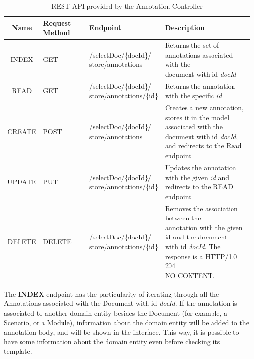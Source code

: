 \begin{table}[h]
\begin{tabular}{ | c | m{1.5cm} | m{3.5cm} |m{7.7cm}|}
    \hline
    \textbf{Name} & \textbf{Request} \textbf{Method }& \textbf{Endpoint} & \textbf{Description}\\ \hline
	INDEX & GET & \parbox[c][1.5cm]{3.5cm}{/selectDoc/\{docId\}/\\store/annotations} & \parbox[c]{8cm}{Returns the set of annotations associated with the \\document with id \textit{docId} }\\ \hline
   	READ & GET & \parbox[c][1.5cm]{3.5cm}{/selectDoc/\{docId\}/\\store/annotations/\{id\}} & Returns the annotation with the specific \textit{id} \\ \hline
    CREATE & POST & \parbox[c]{3.5cm}{/selectDoc/\{docId\}/\\store/annotations} & \parbox[c][1.5cm]{8cm}{Creates a new annotation, stores it in the model \\associated with the document with id \textit{docId}, \\ and redirects to the Read endpoint} \\ \hline
    UPDATE & PUT & \parbox[c][1.5cm]{3.5cm}{/selectDoc/\{docId\}/\\store/annotations/\{id\}} & \parbox[c]{8cm}{Updates the annotation with the given \textit{id} and \\redirects to the READ endpoint} \\ \hline
    DELETE & DELETE & \parbox[t]{3.5cm}{/selectDoc/\{docId\}/\\store/annotations/\{id\}} & \parbox[c][2cm]{8cm}{Removes the association between the \\ annotation with the given id and the document \\ with id \textit{docId}. The response is a HTTP/1.0 204 \\ NO CONTENT.} \\ \hline
  \end{tabular}
  \caption{REST API provided by the Annotation Controller}
  \label{table:endpoints}
\end{table}

The \textbf{INDEX} endpoint has the particularity of iterating through all the Annotations associated with the Document with id \textit{docId}. If the annotation is associated to another domain entity besides the Document (for example, a Scenario, or a Module), information about the domain entity will be added to the annotation body, and will be shown in the interface. This way, it is possible to have some information about the domain entity even before checking its template. 

